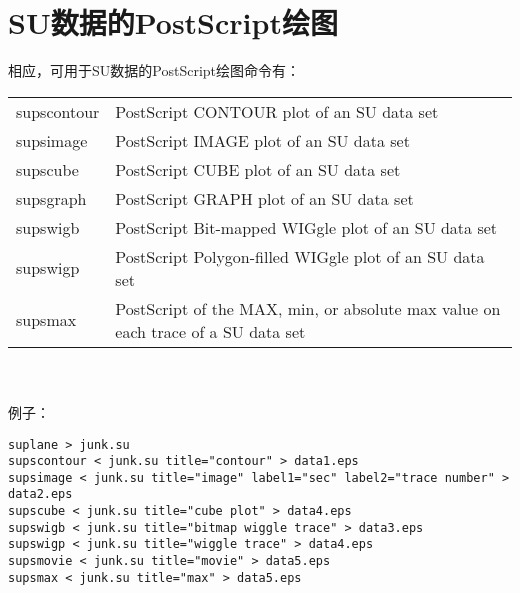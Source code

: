 \section{SU数据的PostScript绘图}
相应，可用于SU数据的PostScript绘图命令有：\par
\begin{tabular}{lp{}}
	\toprule
	supscontour & PostScript CONTOUR plot of an SU data set\\
	supsimage & PostScript IMAGE plot of an SU data set\\
	supscube & PostScript CUBE plot of an SU data set\\
	supsgraph & PostScript GRAPH plot of an SU data set\\
	supswigb & PostScript Bit-mapped WIGgle plot of an SU data set\\
	supswigp & PostScript Polygon-filled WIGgle plot of an SU data set\\
	supsmax & PostScript of the MAX, min, or absolute max value on each trace of a SU data set\\
	\bottomrule
\end{tabular}\\\\
例子：
\begin{lstlisting}
suplane > junk.su 
supscontour < junk.su title="contour" > data1.eps
supsimage < junk.su title="image" label1="sec" label2="trace number" > data2.eps
supscube < junk.su title="cube plot" > data4.eps
supswigb < junk.su title="bitmap wiggle trace" > data3.eps
supswigp < junk.su title="wiggle trace" > data4.eps
supsmovie < junk.su title="movie" > data5.eps
supsmax < junk.su title="max" > data5.eps
\end{lstlisting}


